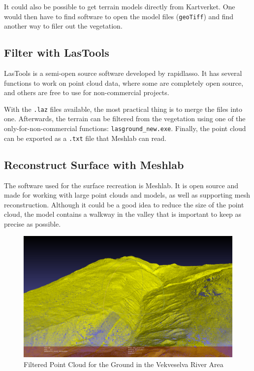         It could also be possible to get terrain models directly from Kartverket. One would then have to find software to open the model files (\texttt{geoTiff}) and find another way to filer out the vegetation.
    
    \subsection{Filter with LasTools}
        LasTools\cite{lastools} is a semi-open source software developed by rapidlasso. It has several functions to work on point cloud data, where some are completely open source, and others are free to use for non-commercial projects.
        
        With the \texttt{.laz} files available, the most practical thing is to merge the files into one. Afterwards, the terrain can be filtered from the vegetation using one of the only-for-non-commercial functions: \texttt{lasground\_new.exe}. Finally, the point cloud can be exported as a \texttt{.txt} file that Meshlab can read.
    
    \subsection{Reconstruct Surface with Meshlab}
        The software used for the surface recreation is Meshlab\cite{LocalChapterEvents:ItalChap:ItalianChapConf2008:129-136}. It is open source and made for working with large point clouds and models, as well as supporting mesh reconstruction. Although it could be a good idea to reduce the size of the point cloud, the model contains a walkway in the valley that is important to keep as precise as possible.
        
        \FloatBarrier
        \begin{figure}[htbp]
            \centering
            \includegraphics[width=\ImageWidth]{figures/point_cloud.PNG}
            \caption{Filtered Point Cloud for the Ground in the Vekveselva River Area}
            \label{fig:point_cloud}
        \end{figure}
        \FloatBarrier
        
